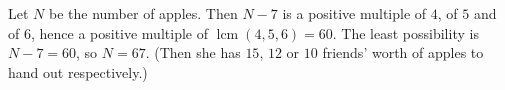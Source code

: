 Let $N$ be the number of apples. Then $N-7$ is a positive multiple of $4$, of $5$ and of $6$, hence a positive multiple of $\operatorname{lcm}(4,5,6)=60$. The least possibility is $N-7=60$, so $N=\boxed{67}$. (Then she has $15$, $12$ or $10$ friends' worth of apples to hand out respectively.)
